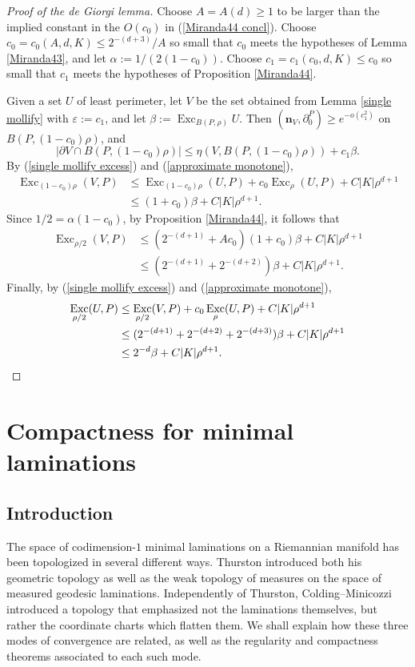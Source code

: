 \documentclass[final,12pt, leqno]{brownthesis}
\DeclareMathOperator{\Exc}{Exc}
\newcommand{\normal}{\mathbf n}
\theoremstyle{definition}
\numberwithin{equation}{section}
\begin{document}
\begin{proof}[Proof of the de Giorgi lemma]
Choose $A = A(d) \geq 1$ to be larger than the implied constant in the $O(c_0)$ in (\ref{Miranda44 concl}).
Choose $c_0 = c_0(A, d, K) \leq 2^{-(d + 3)}/A$ so small that $c_0$ meets the hypotheses of Lemma \ref{Miranda43}, and let $\alpha := 1/(2(1 - c_0))$.
Choose $c_1 = c_1(c_0, d, K) \leq c_0$ so small that $c_1$ meets the hypotheses of Proposition \ref{Miranda44}.

Given a set $U$ of least perimeter, let $V$ be the set obtained from Lemma \ref{single mollify} with $\varepsilon := c_1$, and let $\beta := \Exc_{B(P, \rho)} U$.
Then $(\normal_V, \partial_0^P) \geq e^{-o(c_1^2)}$ on $B(P, (1 - c_0)\rho)$, and
$$|\partial V \cap B(P, (1 - c_0)\rho)| \leq \eta(V, B(P, (1 - c_0)\rho)) + c_1 \beta.$$
By (\ref{single mollify excess}) and (\ref{approximate monotone}),
\begin{align*}
\Exc_{(1 - c_0) \rho} (V, P) &\leq \Exc_{(1 - c_0) \rho} (U, P) + c_0 \Exc_\rho (U, P) + C|K| \rho^{d + 1} \\
&\leq (1 + c_0) \beta + C |K| \rho^{d + 1}.
\end{align*}
Since $1/2 = \alpha (1 - c_0)$, by Proposition \ref{Miranda44}, it follows that
\begin{align*}
    \Exc_{\rho/2} (V, P) &\leq (2^{-(d + 1)} + Ac_0) (1 + c_0) \beta + C |K| \rho^{d + 1} \\
    &\leq (2^{-(d + 1)} + 2^{-(d + 2)}) \beta + C |K| \rho^{d + 1}.
\end{align*}
Finally, by (\ref{single mollify excess}) and (\ref{approximate monotone}),
\begin{align*}
    \Exc_{\rho/2} (U, P)
    &\leq \Exc_{\rho/2} (V, P) + c_0 \Exc_\rho (U, P) + C|K| \rho^{d + 1} \\
    &\leq (2^{-(d + 1)} + 2^{-(d + 2)} + 2^{-(d + 3)}) \beta + C |K| \rho^{d + 1}\\
    &\leq 2^{-d} \beta + C |K| \rho^{d + 1}. \qedhere
\end{align*}
\end{proof}


\chapter{Compactness for minimal laminations}
\section{Introduction}
The space of codimension-$1$ minimal laminations on a Riemannian manifold has been topologized in several different ways.
Thurston \cite[Chapter 8]{thurston1979geometry} introduced both his geometric topology as well as the weak topology of measures on the space of measured geodesic laminations.
Independently of Thurston, Colding--Minicozzi \cite[Appendix B]{ColdingMinicozziIV} introduced a topology that emphasized not the laminations themselves, but rather the coordinate charts which flatten them.
We shall explain how these three modes of convergence are related, as well as the regularity and compactness theorems associated to each such mode.
\end{document}
